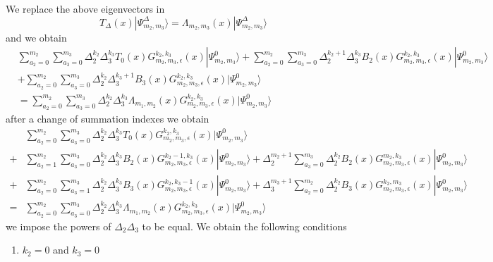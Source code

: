 \documentclass[11pt]{article}
\numberwithin{equation}{section}
\numberwithin{equation}{subsection}
\begin{document}
{We replace the above eigenvectors in 
\begin{equation}
T_{\Delta}(x)|\Psi_{m_{2},m_{3}}^{\Delta}\rangle=\Lambda_{m_{2},m_{3}}(x)|\Psi_{m_{2},m_{3}}^{\Delta}\rangle
\end{equation}
and we obtain
\begin{align*}
&\sum_{a_{2}=0}^{m_{2}}\sum_{a_{3}=0}^{m_{3}}\Delta_{2}^{k_{2}}\Delta_{3}^{k_{3}}T_{0}(x)G_{m_{2},m_{3},\epsilon}^{k_{2},k_{3}}(x)|\Psi_{m_{2},m_{3}}^{0}\rangle+\sum_{a_{2}=0}^{m_{2}}\sum_{a_{3}=0}^{m_{3}}\Delta_{2}^{k_{2}+1}\Delta_{3}^{k_{3}}B_{2}(x)G_{m_{2},m_{3},\epsilon}^{k_{2},k_{3}}(x)|\Psi_{m_{2},m_{3}}^{0}\rangle
\\&
+\sum_{a_{2}=0}^{m_{2}}\sum_{a_{3}=0}^{m_{3}}\Delta_{2}^{k_{2}}\Delta_{3}^{k_{3}+1}B_{3}(x)G_{m_{2},m_{3},\epsilon}^{k_{2},k_{3}}(x)|\Psi_{m_{2},m_{3}}^{0}\rangle
\\&=
\sum_{a_{2}=0}^{m_{2}}\sum_{a_{3}=0}^{m_{3}}\Delta_{2}^{k_{2}}\Delta_{3}^{k_{3}}\Lambda_{m_{1},m_{2}}(x)G_{m_{2},m_{3},\epsilon}^{k_{2},k_{3}}(x)|\Psi_{m_{2},m_{3}}^{0}\rangle
\end{align*}
after a change of summation indexes we obtain
\begin{align*}
&\sum_{a_{2}=0}^{m_{2}}\sum_{a_{3}=0}^{m_{3}}\Delta_{2}^{k_{2}}\Delta_{3}^{k_{3}}T_{0}(x)G_{m_{2},m_{3},\epsilon}^{k_{2},k_{3}}(x)|\Psi_{m_{2},m_{3}}^{0}\rangle
\\+&
\sum_{a_{2}=1}^{m_{2}}\sum_{a_{3}=0}^{m_{3}}\Delta_{2}^{k_{2}}\Delta_{3}^{k_{3}}B_{2}(x)G_{m_{2},m_{3},\epsilon}^{k_{2}-1,k_{3}}(x)|\Psi_{m_{2},m_{3}}^{0}\rangle+\Delta_{2}^{m_{2}+1}\sum_{a_{3}=0}^{m_{3}}\Delta_{2}^{k_{2}}B_{2}(x)G_{m_{2},m_{3},\epsilon}^{m_{2},k_{3}}(x)|\Psi_{m_{2},m_{3}}^{0}\rangle
\\+&
\sum_{a_{2}=0}^{m_{2}}\sum_{a_{3}=1}^{m_{3}}\Delta_{2}^{k_{2}}\Delta_{3}^{k_{3}}B_{3}(x)G_{m_{2},m_{3},\epsilon}^{k_{2},k_{3}-1}(x)|\Psi_{m_{2},m_{3}}^{0}\rangle+\Delta_{3}^{m_{3}+1}\sum_{a_{2}=0}^{m_{2}}\Delta_{2}^{k_{2}}B_{3}(x)G_{m_{2},m_{3},\epsilon}^{k_{2},m_{3}}(x)|\Psi_{m_{2},m_{3}}^{0}\rangle
\\=&
\sum_{a_{2}=0}^{m_{2}}\sum_{a_{3}=0}^{m_{3}}\Delta_{2}^{k_{2}}\Delta_{3}^{k_{3}}\Lambda_{m_{1},m_{2}}(x)G_{m_{2},m_{3},\epsilon}^{k_{2},k_{3}}(x)|\Psi_{m_{2},m_{3}}^{0}\rangle
\end{align*}
we impose the powers of $\Delta_{2}\Delta_{3}$ to be equal. We obtain the following conditions 
\begin{enumerate}
\item $k_{2}=0$ and $k_{3}=0$
\begin{equation}\label{cond1}

\end{equation}
\end{enumerate}}
\end{document}
